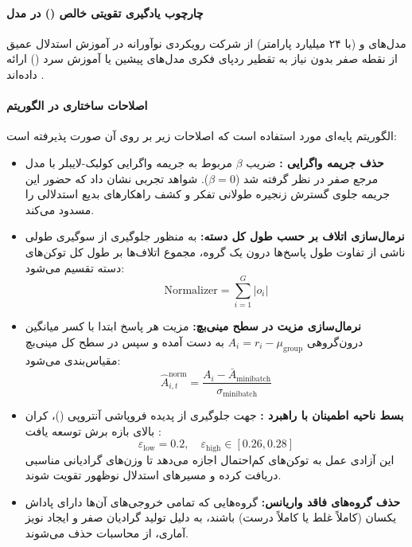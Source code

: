 \item {}

\paragraph*{چارچوب یادگیری تقویتی خالص () در مدل }
مدل‌های  و  (با ۲۴ میلیارد پارامتر) از شرکت  رویکردی نوآورانه در آموزش استدلال عمیق از نقطه صفر بدون نیاز به تقطیر ردپای فکری مدل‌های پیشین یا آموزش سرد () ارائه داده‌اند \cite{mistral2025magistral}.

\paragraph*{اصلاحات ساختاری در الگوریتم }
الگوریتم پایه‌ای مورد استفاده  \cite{shao2024deepseekmath} است که اصلاحات زیر بر روی آن صورت پذیرفته است:
\begin{itemize}
    \item \textbf{حذف جریمه واگرایی :} ضریب $\beta$ مربوط به جریمه واگرایی کولبک-لایبلر با مدل مرجع صفر در نظر گرفته شد ($\beta = 0$). شواهد تجربی نشان داد که حضور این جریمه جلوی گسترش زنجیره طولانی تفکر و کشف راهکارهای بدیع استدلالی را مسدود می‌کند.
    \item \textbf{نرمال‌سازی اتلاف بر حسب طول کل دسته:} به منظور جلوگیری از سوگیری طولی ناشی از تفاوت طول پاسخ‌ها درون یک گروه، مجموع اتلاف‌ها بر طول کل توکن‌های دسته تقسیم می‌شود:
    \begin{equation}
        \text{Normalizer} = \sum_{i=1}^G |o_i|
    \end{equation}
    \item \textbf{نرمال‌سازی مزیت در سطح مینی‌بچ:} مزیت هر پاسخ ابتدا با کسر میانگین درون‌گروهی $A_i = r_i - \mu_{\text{group}}$ به دست آمده و سپس در سطح کل مینی‌بچ مقیاس‌بندی می‌شود:
    \begin{equation}
        \hat{A}_{i,t}^{\text{norm}} = \frac{A_i - \bar{A}_{\text{minibatch}}}{\sigma_{\text{minibatch}}}
    \end{equation}
    \item \textbf{بسط ناحیه اطمینان با راهبرد :} جهت جلوگیری از پدیده فروپاشی آنتروپی ()، کران بالای بازه برش توسعه یافت \cite{yu2025dapo}:
    \begin{equation}
        \varepsilon_{\text{low}} = 0.2, \quad \varepsilon_{\text{high}} \in [0.26, 0.28]
    \end{equation}
    این آزادی عمل به توکن‌های کم‌احتمال اجازه می‌دهد تا وزن‌های گرادیانی مناسبی دریافت کرده و مسیرهای استدلال نوظهور تقویت شوند.
    \item \textbf{حذف گروه‌های فاقد واریانس:} گروه‌هایی که تمامی خروجی‌های آن‌ها دارای پاداش یکسان (کاملاً غلط یا کاملاً درست) باشند، به دلیل تولید گرادیان صفر و ایجاد نویز آماری، از محاسبات حذف می‌شوند.
\end{itemize}
